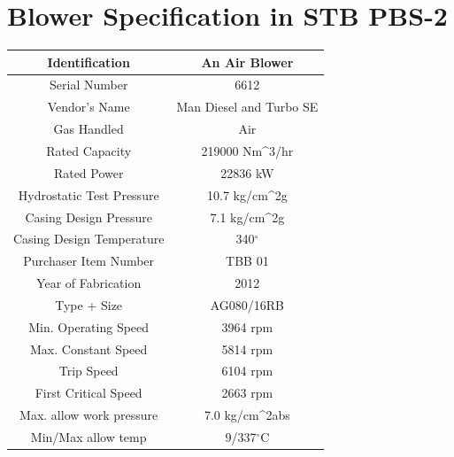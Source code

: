 \documentclass[english,11pt]{report}
\begin{document}
\section{Blower Specification in STB PBS-2}
\begin{center}
\begin{tabular}{|c|c|}
\hline
    \textbf{Identification} &\textbf{An Air Blower} \\ \hline
    Serial Number & 6612 \\ \hline
    Vendor's Name & Man Diesel and Turbo SE \\ \hline
    Gas Handled & Air \\ \hline
    Rated Capacity & 219000 Nm^3/hr \\ \hline
    Rated Power & 22836 kW \\ \hline
    Hydrostatic Test Pressure & 10.7 kg/cm^2g \\ \hline
    Casing Design Pressure & 7.1 kg/cm^2g \\ \hline
    Casing Design Temperature & 340$^{\circ}$ \\ \hline
    Purchaser Item Number & TBB 01 \\ \hline
    Year of Fabrication & 2012 \\ \hline
    Type + Size & AG080/16RB \\ \hline
    Min. Operating Speed & 3964 rpm \\ \hline
    Max. Constant Speed & 5814 rpm \\ \hline
    Trip Speed & 6104 rpm \\ \hline
    First Critical Speed & 2663 rpm \\ \hline
    Max. allow work pressure & 7.0 kg/cm^2abs \\ \hline
    Min/Max allow temp & 9/337$^{\circ}$C \\
\hline
\end{tabular}
\end{center}
\end{document}
